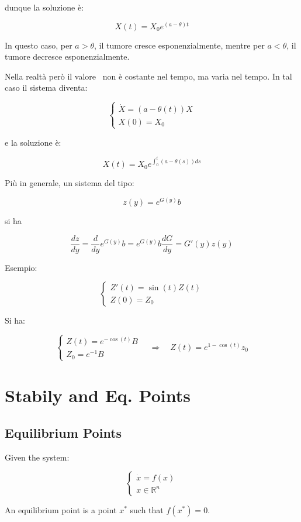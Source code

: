 dunque la soluzione è:

$$
X(t) = X_0 e^{(a - \theta)t}
$$

In questo caso, per $a > \theta$, il tumore cresce esponenzialmente, mentre per $a < \theta$, il tumore decresce esponenzialmente.

Nella realtà però il valore \theta \ non è costante nel tempo, ma varia nel tempo. In tal caso il sistema diventa:

$$
\begin{cases}
\dot X = (a - \theta(t)) X \\
X(0) = X_0
\end{cases}
$$

e la soluzione è:

$$
X(t) = X_0 e^{\int_0^t (a - \theta(s)) ds}
$$


Più in generale, un sistema del tipo:

$$
z(y) = e^{G(y)} b
$$

si ha

$$
\frac{dz}{dy} = \frac{d}{dy} e^{G(y)} b = e^{G(y)} b \frac{dG}{dy} = G'(y)z(y)
$$

Esempio:

$$
\begin{cases}
    Z'(t) = \sin(t) Z(t) \\
    Z(0) = Z_0
\end{cases}
$$

Si ha:

$$
\begin{cases}
Z(t) = e^{-\cos(t)} B \\
Z_0 = e^{-1} B
\end{cases}
\quad \Rightarrow \quad
Z(t) = e^{1-\cos(t)} z_0
$$

\newpage

\section{Stabily and Eq. Points}

\subsection{Equilibrium Points}

Given the system:

$$
\begin{cases}
    \dot x = f(x) \\
    x \in \mathbb{R}^n
\end{cases}
$$

An equilibrium point is a point $x^*$ such that $f(x^*) = 0$.

